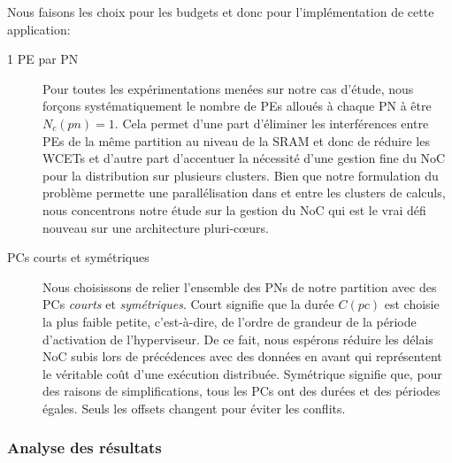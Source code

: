 \documentclass[main.tex]{subfiles}
\begin{document}
Nous faisons les choix pour les budgets et donc pour l'implémentation de cette application:
\begin{description}
    \item[1 PE par PN]
        Pour toutes les expérimentations menées sur notre cas d'étude, nous forçons systématiquement le nombre de PEs alloués à chaque PN à être $N_c(pn) = 1$. Cela permet d'une part d'éliminer les interférences entre PEs de la même partition au niveau de la SRAM et donc de réduire les WCETs et d'autre part d'accentuer la nécessité d'une gestion fine du NoC pour la distribution sur plusieurs clusters. Bien que notre formulation du problème permette une parallélisation dans et entre les clusters de calculs, nous concentrons notre étude sur la gestion du NoC qui est le vrai défi nouveau sur une architecture pluri-c\oe{}urs.
    \item[PCs courts et symétriques]
        Nous choisissons de relier l'ensemble des PNs de notre partition avec des PCs \emph{courts} et \emph{symétriques}. Court signifie que la durée $C(pc)$ est choisie la plus faible petite, c'est-à-dire, de l'ordre de grandeur de la période d'activation de l'hyperviseur. De ce fait, nous espérons réduire les délais NoC subis lors de précédences avec des données en avant qui représentent le véritable coût d'une exécution distribuée. Symétrique signifie que, pour des raisons de simplifications, tous les PCs ont des durées et des périodes égales. Seuls les offsets changent pour éviter les conflits.
\end{description}

\subsubsection{Analyse des résultats}
\end{document}
